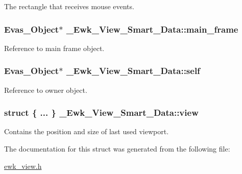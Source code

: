 The rectangle that receives mouse events. \hypertarget{struct__Ewk__View__Smart__Data_a357cddfcb98320392410bdbb6aa075ad}{
\subsubsection[{main\+\_\+frame}]{\setlength{\rightskip}{0pt plus 5cm}Evas\+\_\+\+Object$\ast$ \+\_\+\+Ewk\+\_\+\+View\+\_\+\+Smart\+\_\+\+Data\+::main\+\_\+frame}}\label{struct__Ewk__View__Smart__Data_a357cddfcb98320392410bdbb6aa075ad}
Reference to main frame object. \hypertarget{struct__Ewk__View__Smart__Data_a4b47860af65632ddd1b082f0636e64f7}{
\subsubsection[{self}]{\setlength{\rightskip}{0pt plus 5cm}Evas\+\_\+\+Object$\ast$ \+\_\+\+Ewk\+\_\+\+View\+\_\+\+Smart\+\_\+\+Data\+::self}}\label{struct__Ewk__View__Smart__Data_a4b47860af65632ddd1b082f0636e64f7}
Reference to owner object. \hypertarget{struct__Ewk__View__Smart__Data_abed429c8c6df212ffd6fa0b1df87ab98}{
\subsubsection[{view}]{\setlength{\rightskip}{0pt plus 5cm}struct \{ ... \}   \+\_\+\+Ewk\+\_\+\+View\+\_\+\+Smart\+\_\+\+Data\+::view}}\label{struct__Ewk__View__Smart__Data_abed429c8c6df212ffd6fa0b1df87ab98}
Contains the position and size of last used viewport. 

The documentation for this struct was generated from the following file\+:\begin{DoxyCompactItemize}
\item 
\hyperlink{ewk__view_8h}{ewk\+\_\+view.\+h}\end{DoxyCompactItemize}
